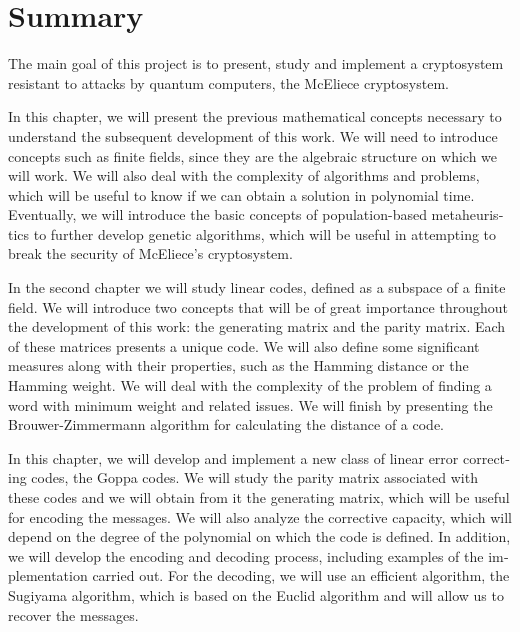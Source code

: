 \chapter*{Summary}

\begin{otherlanguage}{english}

The main goal of this project is to present, study and implement a cryptosystem resistant to attacks by quantum computers, the McEliece cryptosystem.


In this chapter, we will present the previous mathematical concepts necessary to understand the subsequent development of this work. We will need to introduce concepts such as finite fields, since they are the algebraic structure on which we will work. We will also deal with the complexity of algorithms and problems, which will be useful to know if we can obtain a solution in polynomial time. Eventually, we will introduce the basic concepts of population-based metaheuristics to further develop genetic algorithms, which will be useful in attempting to break the security of McEliece's cryptosystem.


In the second chapter we will study linear codes, defined as a subspace of a finite field. We will introduce two concepts that will be of great importance throughout the development of this work: the generating matrix and the parity matrix. Each of these matrices presents a unique code. We will also define some significant measures along with their properties, such as the Hamming distance or the Hamming weight. We will deal with the complexity of the problem of finding a word with minimum weight and related issues. We will finish by presenting the Brouwer-Zimmermann algorithm for calculating the distance of a code.


In this chapter, we will develop and implement a new class of linear error correcting codes, the Goppa codes. We will study the parity matrix associated with these codes and we will obtain from it the generating matrix, which will be useful for encoding the messages. We will also analyze the corrective capacity, which will depend on the degree of the polynomial on which the code is defined. In addition, we will develop the encoding and decoding process, including examples of the implementation carried out. For the decoding, we will use an efficient algorithm, the Sugiyama algorithm, which is based on the Euclid algorithm and will allow us to recover the messages.


\end{otherlanguage}
